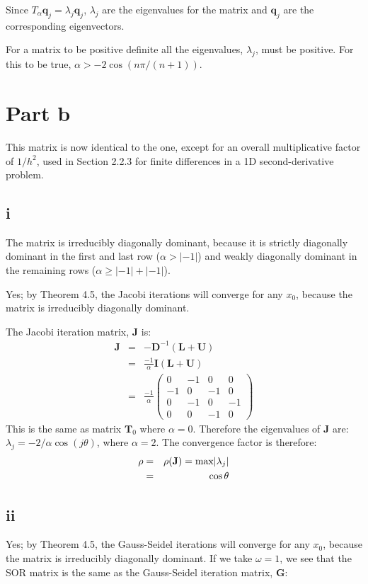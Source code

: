 \documentclass[11pt]{article}
\begin{document}
Since $T_\alpha \mathbf{q}_j = \lambda_j \mathbf{q}_j$, $\lambda_j$ are the eigenvalues for the matrix and $\mathbf{q}_j$ are the corresponding eigenvectors.

For a matrix to be positive definite all the eigenvalues, $\lambda_j$, must be positive. For this to be true, $\alpha > -2 \cos (n \pi / (n+1))$.

\section{Part b}
This matrix is now identical to the one, except for an overall multiplicative factor of $1/h^2$, used in Section 2.2.3 for finite differences in a 1D second-derivative problem. 

\subsection{i}
The matrix is irreducibly diagonally dominant, because it is strictly diagonally dominant in the first and last row ($\alpha > |-1| $) and weakly diagonally dominant in the remaining rows ($\alpha \ge |-1| + |-1|$).

Yes; by Theorem 4.5, the Jacobi iterations will converge for any $x_0$, because the matrix is irreducibly diagonally dominant.

The Jacobi iteration matrix, $\mathbf{J}$ is:
\begin{eqnarray*}
\mathbf{J} &=& -\mathbf{D}^{-1} ( \mathbf{L} + \mathbf{U}) \\
&=& \frac{-1}{\alpha} \mathbf{I} ( \mathbf{L} + \mathbf{U}) \\
&=& \frac{-1}{\alpha}
\left( \begin{array}{cccc}
0 & -1 & 0 & 0 \\
-1 & 0 & -1 & 0 \\
0 & -1 & 0 & -1 \\
0 & 0 & -1 & 0
\end{array} \right)
\end{eqnarray*}
This is the same as matrix $\mathbf{T}_{0}$ where $\alpha = 0$. Therefore the eigenvalues of $\mathbf{J}$ are: $\lambda_j = - 2/\alpha \cos (j \theta) $, where $\alpha = 2$. The convergence factor is therefore:
\begin{eqnarray*}
\rho &=& \rho(\mathbf{J}) = \textnormal{max} |\lambda_j| \\
&=& \cos \theta
\end{eqnarray*}

\subsection{ii}
Yes; by Theorem 4.5, the Gauss-Seidel iterations will converge for any $x_0$, because the matrix is irreducibly diagonally dominant.
If we take $\omega = 1$, we see that the SOR matrix is the same as the Gauss-Seidel iteration matrix, $\mathbf{G}$:
\end{document}
